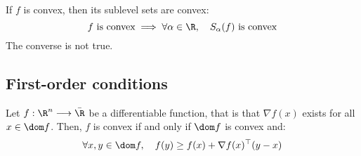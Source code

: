 \begin{property}
    If $f$ is convex, then its sublevel sets are convex:
    \begin{equation*}
        f \text{ is convex} \implies \forall \alpha\in\R, \quad S_\alpha(f) \text{ is convex}
    \end{equation*}
    The converse is not true.
\end{property}

\subsection{First-order conditions}
\begin{property}
    Let $f:\R^n\longrightarrow\bar{\R}$ be a differentiable function, that is that $\nabla f(x)$ exists for all $x\in\dom f$. Then, $f$ is convex if and only if $\dom f$ is convex and:
    \begin{equation*}
        \forall x,y\in\dom f, \quad f(y) \geq f(x) + \nabla f(x)^\top(y-x)
    \end{equation*}
\end{property}